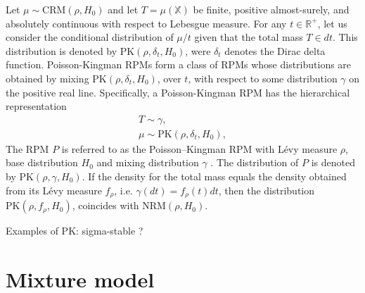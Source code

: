 \begin{definition} \label{def:PKRPM}
Let $\mu \sim \text{CRM}(\rho, H_0)$ and let $T = \mu(\mathbb{X})$ be finite, positive almost-surely, and absolutely continuous with respect to Lebesgue measure. For any $t \in \mathbb{R}^+$, let us consider the conditional distribution of $\mu/t$ given that the total mass $T \in dt$. This distribution is denoted by $\text{PK}(\rho, \delta_t , H_0)$, were $\delta_t$ denotes the Dirac delta function. Poisson-Kingman \gls{RPM}s form a class of \gls{RPM}s whose distributions are obtained by mixing $\text{PK}(\rho, \delta_t , H_0)$, over $t$, with respect to some distribution  $\gamma$ on the positive real line. Specifically, a Poisson-Kingman \gls{RPM} has the hierarchical representation
\begin{gather*}
T \sim \gamma, \\
\mu \sim \text{PK}(\rho, \delta_t, H_0),
\end{gather*}
The \gls{RPM} $P$ is referred to as the Poisson–Kingman \gls{RPM} with Lévy measure $\rho$, base distribution $H_0$ and mixing distribution $\gamma$ . The distribution of $P$ is denoted by $\text{PK}(\rho, \gamma , H_0)$. If the density for the total mass equals the density obtained from its Lévy measure $f_\rho$, i.e. $\gamma(dt) = f_\rho(t) dt$, then the distribution $\text{PK}(\rho, f_\rho , H_0)$, coincides with $\text{NRM}(\rho, H_0)$.
\end{definition}

Examples of PK: sigma-stable ?


\section{Mixture model}
